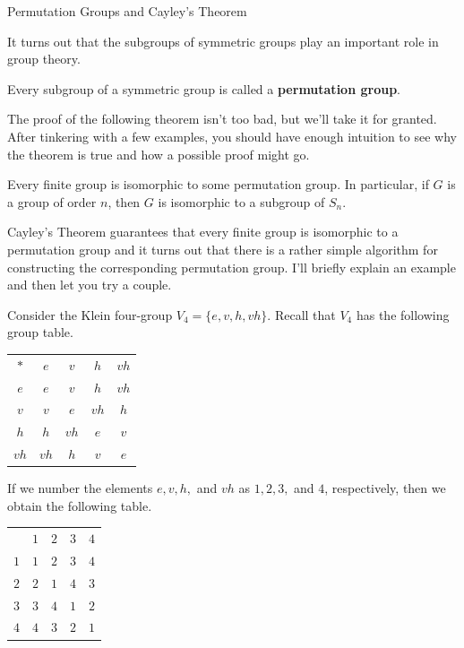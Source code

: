 \begin{section}{Permutation Groups and Cayley's Theorem}

It turns out that the subgroups of symmetric groups play an important role in group theory.

\begin{definition}
Every subgroup of a symmetric group is called a \textbf{permutation group}.
\end{definition}

The proof of the following theorem isn't too bad, but we'll take it for granted. After tinkering with a few examples, you should have enough intuition to see why the theorem is true and how a possible proof might go.

\begin{theorem}
Every finite group is isomorphic to some permutation group.  In particular, if $G$ is a group of order $n$, then $G$ is isomorphic to a subgroup of $S_n$.
\end{theorem}

Cayley's Theorem guarantees that every finite group is isomorphic to a permutation group and it turns out that there is a rather simple algorithm for constructing the corresponding permutation group.  I'll briefly explain an example and then let you try a couple.

Consider the Klein four-group $V_4=\{e,v,h,vh\}$.  Recall that $V_4$ has the following group table.

\begin{center}
\begin{tabular}{c!{\vrule width 2pt}c|c|c|c}
$*$ & $e$ & $v$ & $h$ & $vh$ \\ 
$e$ & $e$ & $v$ & $h$ & $vh$ \\
\hline $v$ & $v$ & $e$ & $vh$ & $h$  \\
\hline $h$ & $h$ & $vh$ & $e$ & $v$\\
\hline $vh$ & $vh$ & $h$ & $v$ & $e$
\end{tabular}
\end{center}

If we number the elements $e,v,h,$ and $vh$ as $1,2,3,$ and $4$, respectively, then we obtain the following table.

\begin{center}
\begin{tabular}{c!{\vrule width 2pt}c|c|c|c}
 & $1$ & $2$ & $3$ & $4$ \\ 
$1$ & $1$ & $2$ & $3$ & $4$ \\
\hline $2$ & $2$ & $1$ & $4$ & $3$  \\
\hline $3$ & $3$ & $4$ & $1$ & $2$\\
\hline $4$ & $4$ & $3$ & $2$ & $1$
\end{tabular}
\end{center}


\end{section}
